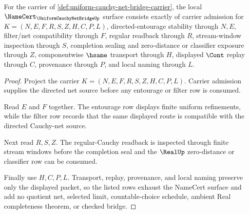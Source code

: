 \begin{theorem}
\label{thm:uniform-cauchy-net-bridge-namecert-obligations}
For the carrier of \autoref{def:uniform-cauchy-net-bridge-carrier}, the local $\NameCert_{\UniformCauchyNetBridgeUp}$ surface consists exactly of carrier admission for $K=(N,E,F,R,S,Z,H,C,P,L)$, directed-entourage stability through $N,E$, filter/net compatibility through $F$, regular readback through $R$, stream-window inspection through $S$, completion sealing and zero-distance or classifier exposure through $Z$, componentwise $\hsame$ transport through $H$, displayed $\Cont$ replay through $C$, provenance through $P$, and local naming through $L$.
\end{theorem}
\begin{proof}
Project the carrier $K=(N,E,F,R,S,Z,H,C,P,L)$. Carrier admission supplies the directed net source before any entourage or filter row is consumed.

Read $E$ and $F$ together. The entourage row displays finite uniform refinements, while the filter row records that the same displayed route is compatible with the directed Cauchy-net source.

Next read $R,S,Z$. The regular-Cauchy readback is inspected through finite stream windows before the completion seal and the $\RealUp$ zero-distance or classifier row can be consumed.

Finally use $H,C,P,L$. Transport, replay, provenance, and local naming preserve only the displayed packet, so the listed rows exhaust the NameCert surface and add no quotient net, selected limit, countable-choice schedule, ambient Real completeness theorem, or checked bridge.
\end{proof}




